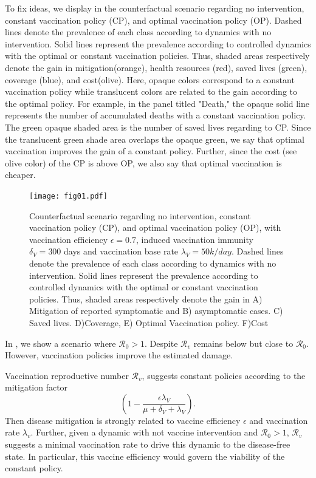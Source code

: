 \documentclass[preprint, sort&compress]{elsarticle}
\begin{document}
    To fix ideas,  we display in  the counterfactual
scenario regarding no intervention, constant vaccination policy (CP), and
optimal vaccination policy (OP). Dashed lines denote the prevalence of each
class according to dynamics with no intervention. Solid lines represent the
prevalence according to controlled dynamics with the optimal or constant
vaccination policies. Thus, shaded areas respectively denote the gain in
mitigation(orange), health resources (red), saved lives (green), coverage
(blue), and cost(olive). Here, opaque colors correspond to a constant
vaccination policy while translucent colors are related to the gain
according to the optimal policy. For example, in the panel titled "Death,"
the opaque solid line represents the number of accumulated deaths with a
constant vaccination policy. The green opaque shaded area is the number of
saved lives regarding to CP. Since the translucent green shade area overlaps
the opaque green, we say that optimal vaccination improves the gain of a
constant policy. Further, since the cost (see olive color) of the CP is above
OP, we also say that optimal vaccination is cheaper.
\begin{figure}[h!]
  \texttt{[image: fig01.pdf]}
  \caption{
        Counterfactual scenario regarding no intervention, constant
        vaccination policy (CP), and optimal vaccination policy (OP),
        with vaccination efficiency $\epsilon = 0.7$, induced vaccination
        immunity $\delta_V= 300$ days and vaccination base rate
        $\lambda_V = 50 k/day$.
        Dashed lines denote the prevalence of each class according to
        dynamics with no intervention. Solid lines represent
        the prevalence according to controlled dynamics with the
        optimal or constant vaccination policies. Thus, shaded areas
        respectively denote the gain in
        A) Mitigation of reported symptomatic and B) asymptomatic cases.
        C) Saved lives. D)Coverage, E) Optimal Vaccination policy.
        F)Cost
}
        \label{fig:bocop_scene}
\end{figure}


In , we show a scenario where $\mathcal{R}_0>1$. Despite $\mathcal{R}_v$ remains below but close to $\mathcal{R}_0$.
However, vaccination policies improve the estimated damage.

Vaccination reproductive number $\mathcal{R}_v$, suggests constant policies
according to the mitigation factor
$$
    \left(
        1 -
        \frac{\epsilon \lambda_V}{\mu+\delta_V+\lambda_V}
    \right).
$$
Then disease mitigation is strongly related to vaccine efficiency
$\epsilon$ and vaccination rate $\lambda_v$. Further, given a dynamic with
not vaccine intervention and $\mathcal{R}_0>1$, $\mathcal{R}_v$ suggests a minimal vaccination rate to drive this dynamic to the disease-free state.
In particular, this vaccine efficiency would govern the viability of the
constant policy.
\end{document}
